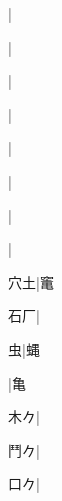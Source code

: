 \begin{multicols}{2}
{{\cjk{}{\cnsym{}　}{\cnsym{}　}{\cnsym{}　}}|{}\par
{\cjk{}{\cnsym{}　}{\cnsym{}　}{\cnsym{}　}}|{}\par
{\cjk{}{\cnsym{}　}{\cnsym{}　}{\cnsym{}　}}|{}\par
{\cjk{}{\cnsym{}　}{\cnsym{}　}{\cnsym{}　}}|{}\par
{\cjk{}{\cnsym{}　}{\cnsym{}　}{\cnsym{}　}}|{}\par
{\cjk{}{\cnsym{}　}{\cnsym{}　}{\cnsym{}　}}|{}\par
{\cjk{}{\cnsym{}　}{\cnsym{}　}{\cnsym{}　}}|{}\par
{\cjk{}{\cnsym{}　}{\cnsym{}　}{\cnsym{}　}}|{}\par
{\cjk{}{\cnsym{}　}穴土}|{\cjk{}竃}\par
{\cjk{}{\cnsym{}　}石厂}|{}\par
{\cjk{}{\cnsym{}　}{\cnsym{}　}虫}|{\cjk{}蝿}\par
{}|{\cjk{}亀}\par
{\cjk{}{\cnsym{}　}木{\cnxb{}𠂊}}|{}\par
{\cjk{}{\cnsym{}　}鬥{\cnxb{}𠂊}}|{}\par
{\cjk{}{\cnsym{}　}口{\cnxb{}𠂊}}|{}\par
}
\end{multicols}
